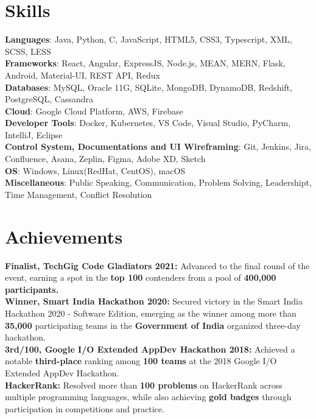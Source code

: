 \documentclass[letterpaper,11pt]{article}
\begin{document}
%
\section{Skills}
 \begin{itemize}[leftmargin=0.15in, label={}]
    \small{\item{
     \textbf{Languages}{: Java, Python, C, JavaScript, HTML5, CSS3, Typescript, XML, SCSS, LESS} \\
     \textbf{Frameworks}{: React, Angular, ExpressJS, Node.js, MEAN, MERN, Flask, Android, Material-UI, REST API, Redux} \\
     \textbf{Databases}{: MySQL, Oracle 11G, SQLite, MongoDB, DynamoDB, Redshift, PostgreSQL, Cassandra} \\
     \textbf{Cloud}{: Google Cloud Platform, AWS, Firebase} \\
     \textbf{Developer Tools}{: Docker, Kubernetes, VS Code, Visual Studio, PyCharm, IntelliJ, Eclipse} \\
     \textbf{Control System, Documentations and UI Wireframing}{: Git, Jenkins, Jira, Confluence, Asana, Zeplin, Figma, Adobe XD, Sketch} \\
     \textbf{OS}{: Windows, Linux(RedHat, CentOS), macOS} \\
     \textbf{Miscellaneous}{: Public Speaking, Communication, Problem Solving, Leadershipt, Time Management, Conflict Resolution }
    }}
 \end{itemize}

\section{Achievements}
 \begin{itemize}[leftmargin=0.15in, label={}]
    \small{\item{
     \textbf{Finalist, TechGig Code Gladiators 2021:}{ Advanced to the final round of the event, earning a spot in the \textbf{top 100} contenders from a pool of \textbf{400,000 participants.}} \\
     \textbf{Winner, Smart India Hackathon 2020:}{ Secured victory in the Smart India Hackathon 2020 - Software Edition, emerging as the winner among more than \textbf{35,000} participating teams in the \textbf{Government of India} organized three-day hackathon.} \\
     \textbf{3rd/100, Google I/O Extended AppDev Hackathon 2018:}{ Achieved a notable \textbf{third-place} ranking among \textbf{100 teams} at the 2018 Google I/O Extended AppDev Hackathon.} \\
     \textbf{HackerRank:}{ Resolved more than \textbf{100 problems} on HackerRank across multiple programming languages, while also achieving \textbf{gold badges} through participation in competitions and practice.} \\
    }}
 \end{itemize}
\end{document}

